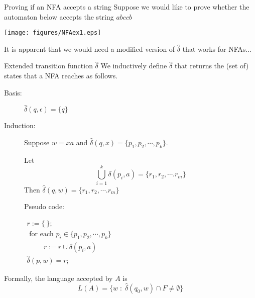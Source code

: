 \documentclass{prosper}%
\begin{document}
\begin{slide}{Proving if an NFA accepts a string}
Suppose we would like to prove whether the automaton below accepts the string $abccb$
\vspace{1cm}
\begin{center}
\texttt{[image: figures/NFAex1.eps]}
\end{center} 

It is apparent that we would need a modified version of $\hat{\delta}$ that works for NFAs...
\end{slide}

\begin{slide}{Extended transition function $\hat{\delta}$}
We inductively define $\hat{\delta}$ that returns the (set of) {\blue states} that a NFA reaches as follows. 
\begin{description}
\item[Basis:] $\hat{\delta}(q, \epsilon)=\{q\}$
\item[Induction:]  Suppose $w=xa$ and  $\hat\delta(q,x)=\{p_1,p_2,\cdots,p_k\}$. 
\begin{minipage}{6cm}
Let
\[
 \bigcup_{i=1}^k\delta(p_i,a)=\{r_1,r_2,\cdots.r_m\}
\]
Then $\hat\delta(q, w)=\{r_1,r_2,\cdots.r_m\}$
\end{minipage}
\begin{minipage}{4cm}
{\blue
Pseudo code:

\(
\begin{array}{l}
r:= \{\ \};\\
\mbox{ for each } p_i\in \{p_1,p_2,\cdots,p_k\} \\
\hspace{1cm}r := r \cup \delta(p_i, a)\\
\hat\delta(p, w)= r;
\end{array}
\)
}
\end{minipage}
\end{description}
Formally, the language accepted by $A$ is
\[
L(A) = \{w\;:\; \hat{\delta}(q_0, w)\cap F\neq \emptyset\}
\]
\end{slide}
\end{document}
